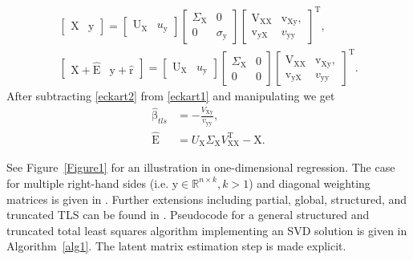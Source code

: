 \documentclass[10pt,a4paper]{article}
\newcommand{\boldvec}[1]{\boldsymbol{\mathrm{#1}}}
\let\vec\boldvec
\newcommand{\designMat}{\vec{X}} %
\newcommand{\observations}{\vec{y}} %
\newcommand{\param}{\vec{\beta}} %
\newcommand{\residual}{\vec{r}} %
\newcommand{\errorMat}{\vec{E}} %
\newcommand{\leftEigenvector}{\vec{U}} %
\newcommand{\rightEigenvector}{\vec{V}} %
\begin{document}
\begin{align}
\begin{bmatrix} \designMat & \observations \end{bmatrix} = \begin{bmatrix} \leftEigenvector_{\designMat} & u_{\observations} \end{bmatrix} \begin{bmatrix} \Sigma_{\designMat} & 0 \\ 0 & \sigma_{\observations} \end{bmatrix} \begin{bmatrix} \rightEigenvector_{\designMat \designMat} & \vec{v}_{\designMat \observations}, \\ \vec{v}_{\observations \designMat} & v_{\observations \observations} \end{bmatrix}^{\mathrm{T}}, \label{eckart1}\\
\begin{bmatrix} \designMat + \hat{\errorMat} & \observations + \hat{\residual} \end{bmatrix} = \begin{bmatrix} \leftEigenvector_{\designMat} & u_{\observations} \end{bmatrix} \begin{bmatrix} \Sigma_{\designMat} & 0 \\ 0 & 0 \end{bmatrix} \begin{bmatrix} \rightEigenvector_{\designMat \designMat} & \vec{v}_{\designMat \observations}, \\ \vec{v}_{\observations \designMat} & v_{\observations \observations} \end{bmatrix}^{\mathrm{T}} \label{eckart2}.
\end{align}
% 
\noindent After subtracting \eqref{eckart2} from \eqref{eckart1} and manipulating we get
%
\begin{align}
\hat{\param}_{tls} &= -\frac{V_{\designMat \observations}}{v_{\observations \observations}}, \label{tls1} \\
\hat{\errorMat} &= U_{\designMat} \Sigma_{\designMat} V_{\designMat \designMat}^{\mathrm{T}} - \designMat. \label{tls2}
\end{align}

\noindent See Figure~\ref{Figure1} for an illustration in one-dimensional regression. The case for multiple right-hand sides (i.e. $\observations \in \mathbb{R}^{n \times k}, k > 1$) and diagonal weighting matrices is given in \cite{Golub96}. Further extensions including partial, global, structured, and truncated TLS can be found in \cite{VanHuffel91}. 
Pseudocode for a general structured and truncated total least squares algorithm implementing an SVD solution is given in Algorithm~\ref{alg1}. The latent matrix estimation step is made explicit. %
\end{document}
